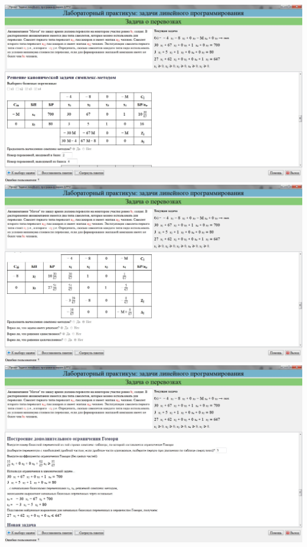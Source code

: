 \includegraphics[width=\linewidth]{om_hw_02/images/1_7.jpg}\\
\includegraphics[width=\linewidth]{om_hw_02/images/1_8.jpg}\\
\includegraphics[width=\linewidth]{om_hw_02/images/1_9.jpg}\\
